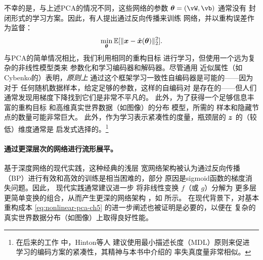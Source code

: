 \documentclass[../../book-main_zh.tex]{subfiles}
\begin{document}
不幸的是，与上述PCA的情况不同，这些网络的参数 $\boldsymbol{\theta} =
(\vW, \vb)$ 通常没有
封闭形式的学习方案。因此，有人提出通过反向传播来训练
网络，并以重构误差作为监督：
\begin{equation}\label{eq:nonlinear-pca-ch5}
  \min_{\boldsymbol{\theta}} \mathbb{E}[ \|\bm{x} - \hat{\bm{x}}(\boldsymbol{\theta})\|_2^2].
\end{equation}
与PCA的简单情况相比，我们利用相同的重构目标
进行学习，但使用一个远为复杂的非线性模型类来
参数化和学习编码器和解码器。尽管通用
近似属性（如Cybenko的）表明，\textit{原则上}
通过这个框架学习一致性自编码器是可能的——因为对于
任何随机数据样本，给定足够的参数，这样的自编码对
是存在的——但人们通常发现用梯度下降找到它们是非常不平凡的。
此外，为了获得一个足够信息丰富的重构目标
和高维真实世界数据（如图像）的分布
模型，所需的
样本和隐藏节点的数量可能非常巨大。
此外，作为学习表示紧凑性的度量，瓶颈层的
$\bm{z}$ 的（较低）维度通常是
启发式选择的。\footnote{在后来的工作 \cite{Hinton-1993} 中，Hinton等人
  建议使用最小描述长度（MDL）原则来促进
  学习的编码方案的紧凑性，其精神与本书中介绍的
率失真度量非常相似。}

\paragraph{通过更深层次的网络进行流形展平。}
基于深度网络的现代实践，这种经典的浅层
宽网络架构被认为通过反向传播（BP）进行有效和高效的训练是相当困难的，部分
原因是sigmoid函数的梯度消失问题。因此，
现代实践通常建议进一步
将非线性变换 $f$（或 $g$）分解为
更多层更简单变换的组合，从而产生更深的网络架构
\cite{Hinton504}，如  所示。
在现代背景下，对基本重构成本
\eqref{eq:nonlinear-pca-ch5} 的进一步阐述也被证明是必要的，以便在
复杂的真实世界数据分布（如图像）上取得良好性能。
\end{document}
